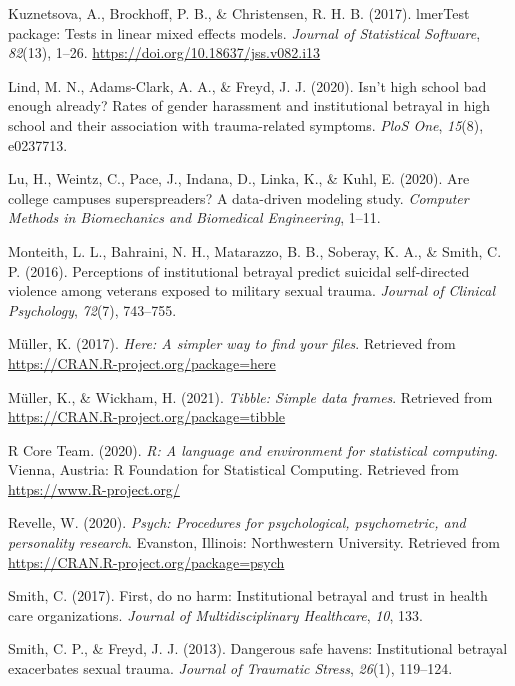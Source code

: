 \documentclass[
  english,
  man, noextraspace]{apa6}
\begin{document}
\leavevmode\hypertarget{ref-R-lmerTest}{}%
Kuznetsova, A., Brockhoff, P. B., \& Christensen, R. H. B. (2017). lmerTest package: Tests in linear mixed effects models. \emph{Journal of Statistical Software}, \emph{82}(13), 1--26. \url{https://doi.org/10.18637/jss.v082.i13}

\leavevmode\hypertarget{ref-lind2020}{}%
Lind, M. N., Adams-Clark, A. A., \& Freyd, J. J. (2020). Isn't high school bad enough already? Rates of gender harassment and institutional betrayal in high school and their association with trauma-related symptoms. \emph{PloS One}, \emph{15}(8), e0237713.

\leavevmode\hypertarget{ref-lu2020college}{}%
Lu, H., Weintz, C., Pace, J., Indana, D., Linka, K., \& Kuhl, E. (2020). Are college campuses superspreaders? A data-driven modeling study. \emph{Computer Methods in Biomechanics and Biomedical Engineering}, 1--11.

\leavevmode\hypertarget{ref-monteith2016}{}%
Monteith, L. L., Bahraini, N. H., Matarazzo, B. B., Soberay, K. A., \& Smith, C. P. (2016). Perceptions of institutional betrayal predict suicidal self-directed violence among veterans exposed to military sexual trauma. \emph{Journal of Clinical Psychology}, \emph{72}(7), 743--755.

\leavevmode\hypertarget{ref-R-here}{}%
Müller, K. (2017). \emph{Here: A simpler way to find your files}. Retrieved from \url{https://CRAN.R-project.org/package=here}

\leavevmode\hypertarget{ref-R-tibble}{}%
Müller, K., \& Wickham, H. (2021). \emph{Tibble: Simple data frames}. Retrieved from \url{https://CRAN.R-project.org/package=tibble}

\leavevmode\hypertarget{ref-R-base}{}%
R Core Team. (2020). \emph{R: A language and environment for statistical computing}. Vienna, Austria: R Foundation for Statistical Computing. Retrieved from \url{https://www.R-project.org/}

\leavevmode\hypertarget{ref-R-psych}{}%
Revelle, W. (2020). \emph{Psych: Procedures for psychological, psychometric, and personality research}. Evanston, Illinois: Northwestern University. Retrieved from \url{https://CRAN.R-project.org/package=psych}

\leavevmode\hypertarget{ref-smith2017first}{}%
Smith, C. (2017). First, do no harm: Institutional betrayal and trust in health care organizations. \emph{Journal of Multidisciplinary Healthcare}, \emph{10}, 133.

\leavevmode\hypertarget{ref-smith2013}{}%
Smith, C. P., \& Freyd, J. J. (2013). Dangerous safe havens: Institutional betrayal exacerbates sexual trauma. \emph{Journal of Traumatic Stress}, \emph{26}(1), 119--124.
\end{document}
